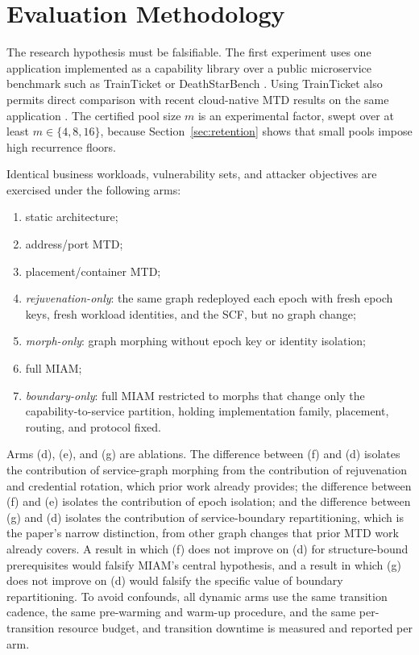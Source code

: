 \documentclass[11pt,letterpaper]{article}
\begin{document}
\section{Evaluation Methodology}\label{sec:eval}

The research hypothesis must be falsifiable. The first experiment uses one application implemented as a capability library over a public microservice benchmark such as TrainTicket or DeathStarBench \cite{zhou2021trainticket,gan2019deathstarbench}. Using TrainTicket also permits direct comparison with recent cloud-native MTD results on the same application \cite{ma2026}. The certified pool size $m$ is an experimental factor, swept over at least $m\in\{4,8,16\}$, because Section~\ref{sec:retention} shows that small pools impose high recurrence floors.

Identical business workloads, vulnerability sets, and attacker objectives are exercised under the following arms:
\begin{enumerate}[leftmargin=2em,itemsep=1pt,label=(\alph*)]
\item static architecture;
\item address/port MTD;
\item placement/container MTD;
\item \emph{rejuvenation-only}: the same graph redeployed each epoch with fresh epoch keys, fresh workload identities, and the SCF, but no graph change;
\item \emph{morph-only}: graph morphing without epoch key or identity isolation;
\item full MIAM;
\item \emph{boundary-only}: full MIAM restricted to morphs that change only the capability-to-service partition, holding implementation family, placement, routing, and protocol fixed.
\end{enumerate}
Arms (d), (e), and (g) are ablations. The difference between (f) and (d) isolates the contribution of service-graph morphing from the contribution of rejuvenation and credential rotation, which prior work already provides; the difference between (f) and (e) isolates the contribution of epoch isolation; and the difference between (g) and (d) isolates the contribution of service-boundary repartitioning, which is the paper's narrow distinction, from other graph changes that prior MTD work already covers. A result in which (f) does not improve on (d) for structure-bound prerequisites would falsify MIAM's central hypothesis, and a result in which (g) does not improve on (d) would falsify the specific value of boundary repartitioning. To avoid confounds, all dynamic arms use the same transition cadence, the same pre-warming and warm-up procedure, and the same per-transition resource budget, and transition downtime is measured and reported per arm.
\end{document}
